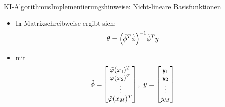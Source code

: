 \documentclass[169, handout	]{THIbeamer} %
\begin{document}
	\begin{frame}{KI-Algorithmus}{Implementierungshinweise: Nicht-lineare Basisfunktionen}
		\begin{itemize}
			\item In Matrixschreibweise ergibt sich:			
		\begin{equation}
			\theta = \Bigl( \tilde{\phi}^T \tilde{\phi} \Bigr) ^{-1} \tilde{\phi}^T y
		\end{equation}
		\item[] mit
		\begin{equation}
			\tilde{\phi} =
			\begin{bmatrix}
				\tilde{\varphi} (x_1)^T \\
				\tilde{\varphi} (x_2)^T \\
				\vdots \\
				\tilde{\varphi} (x_M)^T \\			
			\end{bmatrix}
			\text{,}
			\hspace{0.2 cm}
			y = 
			\begin{bmatrix}
				y_1 \\
				y_2 \\
				\vdots \\
				y_M
			\end{bmatrix}
		\end{equation}
		\end{itemize}	
	\end{frame}			
\end{document}
